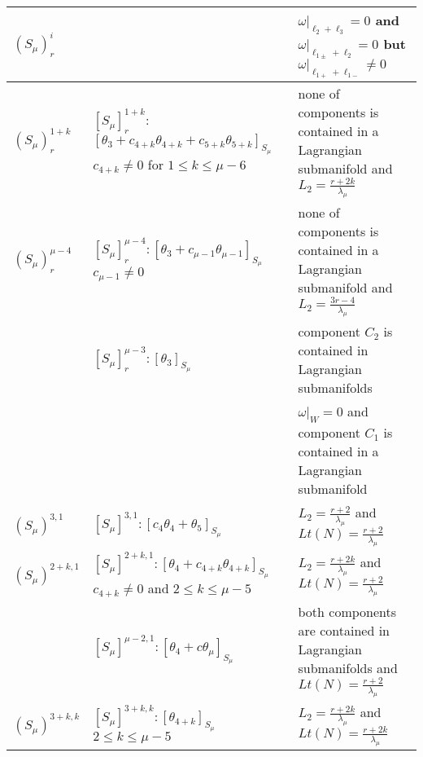 \documentclass{amsart}
\theoremstyle{definition}
\numberwithin{equation}{section}
\begin{document}
\begin{center}
\begin{table}[h]
\begin{small}
\begin{tabular}{|p{1.2cm}|p{4.6cm}|p{6cm}|}
$(S_{\mu}\!)^{i}_r$ & &  $\omega|_{\ell_2+\ell_3} = 0$ and $\omega|_{\ell_{1\pm}+\ell_2} = 0$ \newline but $\omega|_{\ell_{1+}+\ell_{1-}} \ne 0$ \\ \hline

$(S_{\mu}\!)^{1+k}_r$ & $[S_{\mu}]^{1+k}_r\!:$ \newline $[\theta _3\!+\!c_{4\!+k}\theta_{4\!+k}\!+\! c_{5\!+k}\theta_{5\!+k}]_{S_{\mu}}$
                                                    \newline $c_{4+k} \ne 0$ for $1\leq k\leq \mu-6$ &  none of components is contained in a Lagrangian submanifold and $L_2=\frac{r+2k}{\lambda_{\mu}}$     \\ \hline

$(S_{\mu}\!)^{\mu-4}_r$ & $[S_{\mu}]^{\mu-4}_r: [\theta _3 +c_{\mu-1} \theta _{\mu-1} ]_{S_{\mu}}$ \newline $c_{\mu-1} \ne 0$ & none of components is contained in a Lagrangian submanifold and $L_2=\frac{3r-4}{\lambda_{\mu}}$  \\ \cline{2-3}

& $[S_{\mu}]^{\mu-3}_r: [\theta _3 ]_{S_{\mu}}$ & component $C_2$ is contained in  Lagrangian submanifolds \\ \hline \hline

& & $\omega\vert_ W = 0$ and  component $C_1$ is contained in a Lagrangian submanifold \\ \hline

$(S_{\mu}\!)^{3,1}$ & $[S_{\mu}]^{3,1}: [c_4\theta _4 + \theta_{5}]_{S_{\mu}}$
                                                     &   $L_2=\frac{r+2}{\lambda_{\mu}}$  and $Lt(N)=\frac{r+2}{\lambda_{\mu}}$   \\ \hline
$(S_{\mu}\!)^{2+k,1}$ & $[S_{\mu}]^{2+k,1}: [\theta _4 + c_{4+k}\theta_{4+k}]_{S_{\mu}}$
                                                    \newline $c_{4+k} \ne 0$ and $2\leq k\leq \mu-5$ &   $L_2=\frac{r+2k}{\lambda_{\mu}}$  and $Lt(N)=\frac{r+2}{\lambda_{\mu}}$   \\ \cline{2-3}

& $[S_{\mu}]^{\mu-2,1}: [\theta _4 + c \theta _{\mu} ]_{S_{\mu}}$ \  & both components are contained in  Lagrangian submanifolds  and $Lt(N)=\frac{r+2}{\lambda_{\mu}}$\\ \hline

$(S_{\mu}\!)^{3+k,k}$ & $[S_{\mu}]^{3+k,k}: [\theta _{4+k} ]_{S_{\mu}}$ \newline $2\leq k\leq \mu-5$ & $L_2=\frac{r+2k}{\lambda_{\mu}}$  and $Lt(N)=\frac{r+2k}{\lambda_{\mu}}$   \\ \cline{2-3}


\end{tabular}
\end{small}
\end{table}
\end{center}
\end{document}
